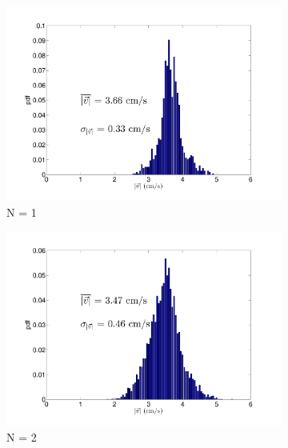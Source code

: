 \documentclass[12pt]{article}
\begin{document}
\begin{figure}[h!]
	\begin{subfigure}[h!]{0.5\textwidth}
    \centering
       \includegraphics[scale=0.28]{cb_1_3mm_250mm_v_pdf.pdf}
       \caption{N = 1}
       \label{fig:vpdf_1_25}
	\end{subfigure}
	\hfill
	\begin{subfigure}[h!]{0.5\textwidth}
    \centering
       \includegraphics[scale=0.28]{cb_2_3mm_250mm_v_pdf.pdf}
       \caption{N = 2}
       \label{fig:vpdf_2_25cm}
	\end{subfigure}
	\begin{subfigure}[h!]{0.5\textwidth}
    \centering

\end{subfigure}
\end{figure}
\end{document}

